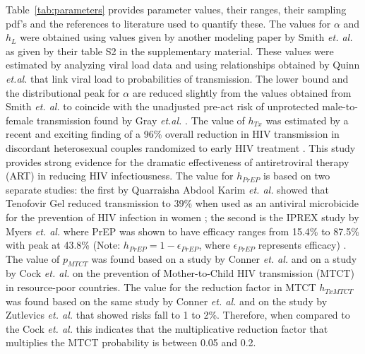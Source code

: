 \documentclass[11pt]{nih_mod}
\begin{document}
Table~\ref{tab:parameters} provides parameter values, their ranges, their sampling pdf's and the references to literature used to quantify these. The values for $\alpha$ and $h_L$ were obtained using values given by another modeling paper by Smith {\it et. al.} \cite{Smith2010} as given by their table S2 in the supplementary material. These values were estimated by analyzing viral load data and using relationships obtained by Quinn {\it et.al.} \cite{Quinn2000} that link viral load to probabilities of transmission. The lower bound and the distributional peak for $\alpha$ are reduced slightly from the values obtained from Smith {\it et. al.} \cite{Smith2010} to coincide with the unadjusted pre-act risk of unprotected male-to-female transmission found by Gray {\it et.al.} \cite{Gray2012}. The value of $h_{Tx}$ was estimated by a recent and exciting finding of a 96\% overall reduction in HIV transmission in discordant heterosexual couples randomized to early HIV treatment \cite{Cohen2011}. This study provides strong evidence for the dramatic effectiveness of antiretroviral therapy (ART) in reducing HIV infectiousness. The value for $h_{PrEP}$ is based on two separate studies: the first by Quarraisha Abdool Karim {\it et. al.} showed that Tenofovir Gel reduced transmission to 39\% when used as an antiviral microbicide for the prevention of HIV infection in women \cite{Karim2010}; the second is the IPREX study by Myers {\it et. al.} where PrEP was shown to have efficacy ranges from 15.4\% to 87.5\%
with peak at 43.8\% (Note: $h_{PrEP}=1-\epsilon_{PrEP}$, where $\epsilon_{PrEP}$ represents efficacy) \cite{Myers2011}. The value of $p_{MTCT}$ was found based on a study by Conner {\it et. al.} \cite{Connor1994} and on a study by Cock {\it et. al.} \cite{Cock2000} on the prevention of Mother-to-Child  HIV transmission (MTCT) in resource-poor countries. The value for the reduction factor in MTCT $h_{TxMTCT}$ was found based on the same study by Conner {\it et. al.} \cite{Connor1994} and on the study by Zutlevics {\it et. al.} \cite{Zutlevics2006} that showed risks fall to 1 to 2\%. Therefore, when compared to the Cock {\it et. al.} this indicates that the multiplicative reduction factor that multiplies the MTCT probability is between 0.05 and 0.2.
\end{document}
